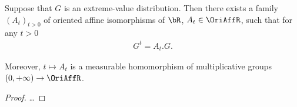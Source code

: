 \begin{lemma}
  \label{lem:self-similarity-of-extreme-value-distributions}
  \leanok
  Suppose that $G$ is an extreme-value distribution.
  Then there exists a family $(A_t)_{t > 0}$ of
  oriented affine isomorphisms of $\bR$, $A_t \in \OriAffR$,
  such that for any $t > 0$
  \begin{align*}
    G^t = A_t . G .
  \end{align*}

  Moreover, $t \mapsto A_t$ is a measurable homomorphism
  of multiplicative groups $(0,+\infty) \to \OriAffR$.
\end{lemma}
\begin{proof}
  \ldots
\end{proof}

%
%
%
%

